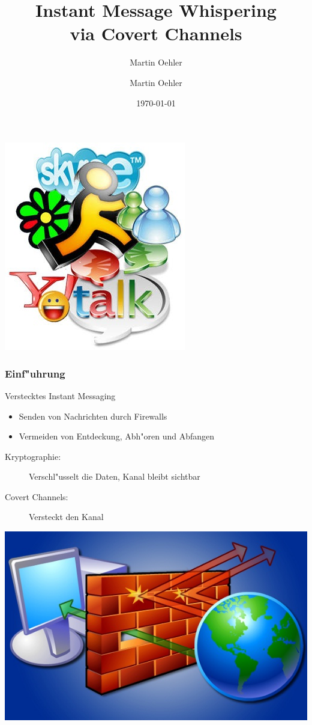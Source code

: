 \documentclass[accentcolor=tud9d,colorbacktitle,inverttitle,landscape,german,presentation,t]{tudbeamer}
\begin{document}
	\title{Instant Message Whispering \\via Covert Channels}
	\subtitle{Martin Oehler}
	
	\author{Martin Oehler}
	\date{\today}

\begin{titleframe}
	\includegraphics[scale=.5]{Bilder/InstantMessenger.jpg}
\end{titleframe}

\begin{frame}
	\frametitle{Einf"uhrung}

	Verstecktes Instant Messaging
	\begin{itemize}
		\item Senden von Nachrichten durch Firewalls
		\item Vermeiden von Entdeckung, Abh"oren und Abfangen
	\end{itemize}
	\textbf{} \newline
	
	\begin{description}
		\item[Kryptographie:] Verschl"usselt die Daten, Kanal bleibt sichtbar
		\item[Covert Channels:] Versteckt den Kanal
	\end{description}
	
	\begin{center}
	\includegraphics[scale=.3]{Bilder/Firewall.jpg}
	\end{center}
	
\end{frame}
\end{document}
